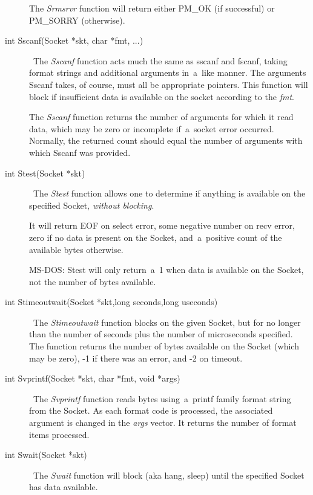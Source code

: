\documentclass[12pt]{article}
\begin{document}
\begin{description}
    The {\em Srmsrvr} function will return either {\small PM\_OK} (if
    successful) or {\small PM\_SORRY} (otherwise).

\item[int Sscanf(Socket *skt, char *fmt, ...)] \     The {\em Sscanf} function acts much the same as sscanf and fscanf, taking
    format strings and additional arguments in~a~like manner.  The arguments
    Sscanf takes, of course, must all be appropriate pointers.  This function
    will block if insufficient data is available on the socket according to the
    {\em fmt}.

    The {\em Sscanf} function returns the number of arguments for which it read
    data, which may be zero or incomplete if~a~socket error occurred.
    Normally, the returned count should equal the number of arguments with
    which Sscanf was provided.

\item[int Stest(Socket *skt)] \     The {\em Stest} function allows one to determine if anything is available
    on the specified Socket, {\em without blocking}.

    It will return EOF on select error, some negative number on recv error,
    zero if no data is present on the Socket, and~a~positive count of the
    available bytes otherwise.

    {\small MS-DOS}: Stest will only return~a~1 when data is available
    on the Socket, not the number of bytes available.

\item[int Stimeoutwait(Socket *skt,long seconds,long useconds)] \     The {\em Stimeoutwait} function blocks on the given Socket, but for no
    longer than the number of seconds plus the number of microseconds specified.
    The function returns the number of bytes available on the Socket (which may be
    zero), -1 if there was an error, and -2 on timeout.

\item[int Svprintf(Socket *skt, char *fmt, void *args)] \     The {\em Svprintf} function reads bytes using~a~printf family format string
    from the Socket.  As each format code is processed, the associated argument
    is changed in the {\em args} vector.  It returns the number of format items
    processed.

\item[int Swait(Socket *skt)] \     The {\em Swait} function will block (aka hang, sleep) until the specified
    Socket has data available.


\end{description}
\end{document}
